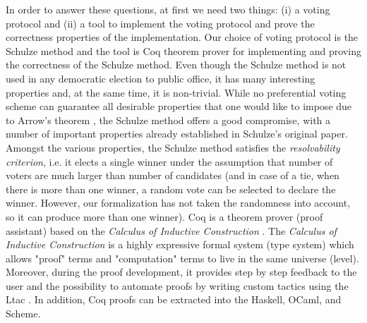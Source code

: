 In order to answer these questions, at first we need two things: (i) a voting protocol and 
(ii) a tool to implement the voting protocol and prove the correctness properties of the implementation. 
Our choice of voting protocol is the   Schulze method \citep{Schulze:2011:NMC} and 
the tool is Coq \citep{Bertot:2004:ITP} theorem prover  for implementing and proving 
the correctness of  the Schulze method.
Even though the Schulze method is not used in any democratic election to public office,
it has many interesting properties and, 
 at the same time, it is non-trivial.  
While no preferential voting scheme can guarantee all desirable properties that one would
like to impose due to Arrow’s theorem \citep{Arrow:1950:DCS}, the Schulze method offers a good compromise, 
with a number of important properties already  established  in  Schulze’s  original  paper. 
Amongst the various  properties, the Schulze method satisfies the \textit{resolvability criterion}, 
i.e. it elects a single winner under the assumption that number of voters are much larger than
 number of candidates (and in case of a tie, when there is more than one winner, a random vote can be 
selected to declare the winner.  However, our formalization 
has not taken the randomness into account, so it can produce more than one winner). 
Coq is a theorem prover (proof assistant) based on the \textit{Calculus of Inductive Construction} 
\citep{Coquand:1988:CC:47724.47725} \citep{coquand1988inductively}. 
The \textit{Calculus of Inductive Construction} is a highly expressive formal system (type system) 
which allows "proof" terms and 
"computation" terms to live in the same universe (level). Moreover, during the proof development, 
it provides step by step feedback to the user and the possibility to automate proofs by 
writing custom tactics using the Ltac \citep{10.5555/1765236.1765246}. In addition, 
Coq proofs can be extracted into the  Haskell, OCaml, and Scheme.
 
